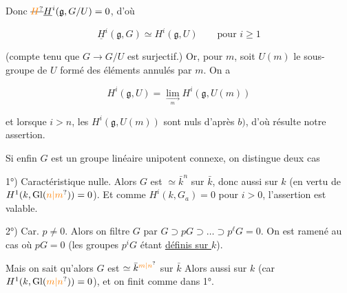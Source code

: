 
Donc $\deleted{\unsure{H}}\underline{H}^i(\mathfrak g,G/U)=0$,   d'où

\[\underline{H}^i(\mathfrak g,G)\simeq H^i(\mathfrak g,U)\qquad\text{pour }i\geq1\]


(compte tenu que $G\longrightarrow G/U$ est surjectif.) Or, pour  $m$, soit $U(m)$ le sous-groupe de $U$ formé des éléments annulés par $m$. On a

\[H^i(\mathfrak g,U)=\lim_{\underset m\longrightarrow} H^i(\mathfrak g,U(m))\]



et lorsque $i>n$, les  $H^i(\mathfrak g,U(m))$ sont nuls d'après $b)$,  d'où résulte notre assertion.

Si enfin $G$ est  un groupe linéaire unipotent connexe, on distingue deux cas

1°) Caractéristique nulle. Alors $G$ est $\simeq\bar k^n$ sur $\bar k$, donc aussi sur $k$ (en vertu de $H^1(k,\operatorname{Gl}(\unsure{n|m}))=0$). Et comme $H^i(k,G_a)=0$ pour $i>0$, l'assertion est valable.

2°) Car. $p\ne0$. Alors on filtre $G$ par $G\supset pG\supset\ldots\supset p^\ell G=0$. On est ramené au cas où $pG=0$ (les groupes $p^iG$ étant \uline{définis sur $k$}).

\margin{$//$}

Mais on sait qu'alors $G$ est $\simeq\bar k^{\unsure{m|n}}$ sur $\bar k$ Alors \deleted{\unsure{=|\simeq}} aussi sur $k$ (car $H^1(k,\operatorname{Gl}(\unsure{m|n}))=0$), et on finit comme dans 1°.

